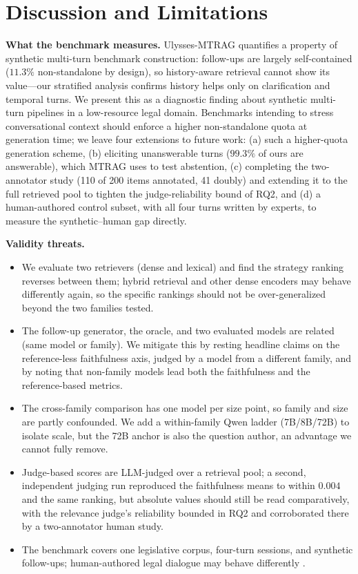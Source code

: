 \documentclass[conference]{IEEEtran}
\begin{document}
\section{Discussion and Limitations}
\label{sec:discussion}
\textbf{What the benchmark measures.} Ulysses-MTRAG quantifies a property of
synthetic multi-turn benchmark construction: follow-ups are largely self-contained
($11.3\%$ non-standalone by design), so history-aware retrieval cannot show its
value---our stratified analysis confirms history helps only on clarification and
temporal turns. We present this as a diagnostic finding about synthetic multi-turn
pipelines in a low-resource legal domain. Benchmarks intending to stress
conversational context should enforce a higher non-standalone quota at generation
time; we leave four extensions to future work: (a) such a higher-quota
generation scheme, (b) eliciting unanswerable turns ($99.3\%$ of ours are
answerable), which MTRAG \cite{Katsis2025MTRAG} uses to test abstention,
(c) completing the two-annotator study (110 of 200 items annotated, 41 doubly)
and extending it to the full retrieved pool to tighten the judge-reliability
bound of RQ2, and (d) a human-authored control subset, with all four turns
written by experts, to measure the synthetic--human gap directly.

\textbf{Validity threats.}
\begin{itemize}
  \item[(i)] We evaluate two retrievers (dense and lexical) and find the strategy
  ranking reverses between them; hybrid retrieval and other dense encoders may
  behave differently again, so the specific rankings should not be
  over-generalized beyond the two families tested.
  \item[(ii)] The follow-up generator, the oracle, and two evaluated models are
  related (same model or family). We mitigate this by resting headline claims on
  the reference-less faithfulness axis, judged by a model from a different
  family, and by noting that non-family models lead both the faithfulness and
  the reference-based metrics.
  \item[(iii)] The cross-family comparison has one model per size point, so
  family and size are partly confounded. We add a within-family Qwen ladder
  (7B/8B/72B) to isolate scale, but the 72B anchor is also the question author,
  an advantage we cannot fully remove.
  \item[(iv)] Judge-based scores are LLM-judged over a retrieval pool; a second,
  independent judging run reproduced the faithfulness means to within $0.004$
  and the same ranking, but absolute values should still be read comparatively,
  with the relevance judge's reliability bounded in RQ2 and corroborated there by
  a two-annotator human study.
  \item[(v)] The benchmark covers one legislative corpus, four-turn sessions, and
  synthetic follow-ups; human-authored legal dialogue may behave differently
  \cite{Qu2020ORConvQA}.
\end{itemize}
\end{document}
